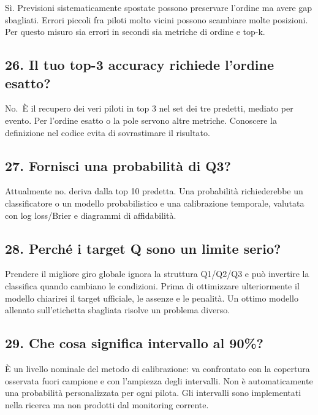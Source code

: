 \documentclass[11pt,a4paper]{article}
\newcommand{\code}[1]{{\ttfamily\small\seqsplit{#1}}}
\begin{document}
Sì. Previsioni sistematicamente spostate possono preservare l'ordine ma avere gap sbagliati. Errori piccoli fra piloti molto vicini possono scambiare molte posizioni. Per questo misuro sia errori in secondi sia metriche di ordine e top-k.

\subsection{26. Il tuo top-3 accuracy richiede l'ordine esatto?}\label{il-tuo-top-3-accuracy-richiede-lordine-esatto}

No.~È il recupero dei veri piloti in top 3 nel set dei tre predetti, mediato per evento. Per l'ordine esatto o la pole servono altre metriche. Conoscere la definizione nel codice evita di sovrastimare il risultato.

\subsection{27. Fornisci una probabilità di Q3?}\label{fornisci-una-probabilituxe0-di-q3}

Attualmente no. \code{predicted\_reached\_q3} deriva dalla top 10 predetta. Una probabilità richiederebbe un classificatore o un modello probabilistico e una calibrazione temporale, valutata con log loss/Brier e diagrammi di affidabilità.

\subsection{28. Perché i target Q sono un limite serio?}\label{perchuxe9-i-target-q-sono-un-limite-serio}

Prendere il migliore giro globale ignora la struttura Q1/Q2/Q3 e può invertire la classifica quando cambiano le condizioni. Prima di ottimizzare ulteriormente il modello chiarirei il target ufficiale, le assenze e le penalità. Un ottimo modello allenato sull'etichetta sbagliata risolve un problema diverso.

\subsection{29. Che cosa significa intervallo al 90\%?}\label{che-cosa-significa-intervallo-al-90}

È un livello nominale del metodo di calibrazione: va confrontato con la copertura osservata fuori campione e con l'ampiezza degli intervalli. Non è automaticamente una probabilità personalizzata per ogni pilota. Gli intervalli sono implementati nella ricerca ma non prodotti dal monitoring corrente.
\end{document}
